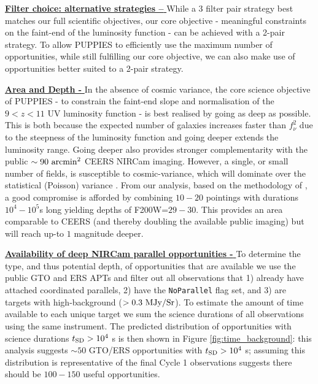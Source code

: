 \documentclass[12pt]{article}
\begin{document}
\vspace{2mm}
\noindent
\underline{\bf Filter choice: alternative strategies -- } While a 3 filter pair strategy best matches our full scientific objectives, our core objective - meaningful constraints on the faint-end of the luminosity function - can be achieved with a 2-pair strategy. To allow PUPPIES to efficiently use the maximum number of opportunities, while still fulfilling our core objective, we can also make use of opportunities better suited to a 2-pair strategy.

\vspace{2mm}
\noindent
\underline{\bf Area and Depth - } In the absence of cosmic variance, the core science objective of PUPPIES - to constrain the faint-end slope and normalisation of the $9<z<11$ UV luminosity function - is best realised by going as deep as possible. This is both because the expected number of galaxies increases faster than $f_{\nu}^2$ due to the steepness of the luminosity function and going deeper extends the luminosity range. Going deeper also provides stronger complementarity with the public $\sim 90\ {\rm arcmin}^2$ CEERS NIRCam imaging. However, a single, or small number of fields, is susceptible to cosmic-variance, which will dominate over the statistical (Poisson) variance \citep[e.g.,][]{2020MNRAS.499.2401T}. From our analysis, based on the methodology of \citet{2020MNRAS.499.2401T}, a good compromise is afforded by combining $10-20$ pointings with durations $10^4-10^5$s long yielding depths of F200W=$29-30$. This provides an area comparable to CEERS (and thereby doubling the available public imaging) but will reach up-to $1$ magnitude deeper.


\vspace{2mm}
\noindent
\underline{\bf Availability of deep NIRCam parallel opportunities - }
To determine the type, and thus potential depth, of opportunities that are available we use the public GTO and ERS APTs and filter out all observations that 1) already have attached coordinated parallels, 2) have the \texttt{NoParallel} flag set, and 3) are targets with high-background ($>0.3\ {\rm MJy/Sr}$). To estimate the amount of time available to each unique target we sum the science durations of all observations using the same instrument. The predicted distribution of opportunities with science durations $t_{\rm SD}>10^{4}$ s is then shown in Figure \ref{fig:time_background}: this analysis suggests $\sim 50$ GTO/ERS opportunities with $t_{\rm SD}>10^{4}$ s; assuming this distribution is representative of the final Cycle 1 observations suggests there should be $100-150$ useful opportunities.
\end{document}

